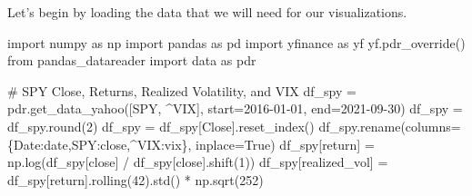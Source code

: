 \documentclass[
  letterpaper,
  DIV=11,
  numbers=noendperiod]{scrreprt}
\newenvironment{Shaded}{\begin{snugshade}}{\end{snugshade}}
\newcommand{\BuiltInTok}[1]{\textcolor[rgb]{0.00,0.23,0.31}{#1}}
\newcommand{\CommentTok}[1]{\textcolor[rgb]{0.37,0.37,0.37}{#1}}
\newcommand{\DecValTok}[1]{\textcolor[rgb]{0.68,0.00,0.00}{#1}}
\newcommand{\ImportTok}[1]{\textcolor[rgb]{0.00,0.46,0.62}{#1}}
\newcommand{\NormalTok}[1]{\textcolor[rgb]{0.00,0.23,0.31}{#1}}
\newcommand{\OperatorTok}[1]{\textcolor[rgb]{0.37,0.37,0.37}{#1}}
\newcommand{\StringTok}[1]{\textcolor[rgb]{0.13,0.47,0.30}{#1}}
\newcommand{\VariableTok}[1]{\textcolor[rgb]{0.07,0.07,0.07}{#1}}
\begin{document}
Let's begin by loading the data that we will need for our
visualizations.

\begin{Shaded}
\begin{Highlighting}[]
\ImportTok{import}\NormalTok{ numpy }\ImportTok{as}\NormalTok{ np}
\ImportTok{import}\NormalTok{ pandas }\ImportTok{as}\NormalTok{ pd}
\ImportTok{import}\NormalTok{ yfinance }\ImportTok{as}\NormalTok{ yf}
\NormalTok{yf.pdr\_override()}
\ImportTok{from}\NormalTok{ pandas\_datareader }\ImportTok{import}\NormalTok{ data }\ImportTok{as}\NormalTok{ pdr}

\CommentTok{\# SPY Close, Returns, Realized Volatility, and VIX}
\NormalTok{df\_spy }\OperatorTok{=}\NormalTok{ pdr.get\_data\_yahoo([}\StringTok{\textquotesingle{}SPY\textquotesingle{}}\NormalTok{, }\StringTok{\textquotesingle{}\^{}VIX\textquotesingle{}}\NormalTok{], start}\OperatorTok{=}\StringTok{\textquotesingle{}2016{-}01{-}01\textquotesingle{}}\NormalTok{, end}\OperatorTok{=}\StringTok{\textquotesingle{}2021{-}09{-}30\textquotesingle{}}\NormalTok{)}
\NormalTok{df\_spy }\OperatorTok{=}\NormalTok{ df\_spy.}\BuiltInTok{round}\NormalTok{(}\DecValTok{2}\NormalTok{)}
\NormalTok{df\_spy }\OperatorTok{=}\NormalTok{ df\_spy[}\StringTok{\textquotesingle{}Close\textquotesingle{}}\NormalTok{].reset\_index()}
\NormalTok{df\_spy.rename(columns}\OperatorTok{=}\NormalTok{\{}\StringTok{\textquotesingle{}Date\textquotesingle{}}\NormalTok{:}\StringTok{\textquotesingle{}date\textquotesingle{}}\NormalTok{,}\StringTok{\textquotesingle{}SPY\textquotesingle{}}\NormalTok{:}\StringTok{\textquotesingle{}close\textquotesingle{}}\NormalTok{,}\StringTok{\textquotesingle{}\^{}VIX\textquotesingle{}}\NormalTok{:}\StringTok{\textquotesingle{}vix\textquotesingle{}}\NormalTok{\}, inplace}\OperatorTok{=}\VariableTok{True}\NormalTok{)}
\NormalTok{df\_spy[}\StringTok{\textquotesingle{}return\textquotesingle{}}\NormalTok{] }\OperatorTok{=}\NormalTok{ np.log(df\_spy[}\StringTok{\textquotesingle{}close\textquotesingle{}}\NormalTok{] }\OperatorTok{/}\NormalTok{ df\_spy[}\StringTok{\textquotesingle{}close\textquotesingle{}}\NormalTok{].shift(}\DecValTok{1}\NormalTok{))}
\NormalTok{df\_spy[}\StringTok{\textquotesingle{}realized\_vol\textquotesingle{}}\NormalTok{] }\OperatorTok{=}\NormalTok{ df\_spy[}\StringTok{\textquotesingle{}return\textquotesingle{}}\NormalTok{].rolling(}\DecValTok{42}\NormalTok{).std() }\OperatorTok{*}\NormalTok{ np.sqrt(}\DecValTok{252}\NormalTok{)}


\end{Highlighting}
\end{Shaded}
\end{document}
